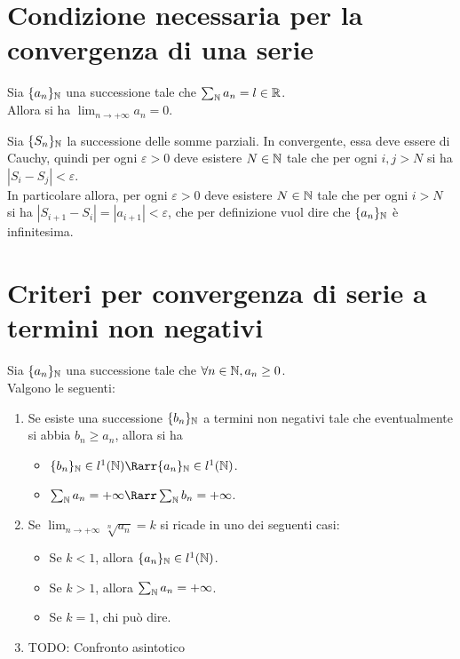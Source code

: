 \documentclass[openany]{book}
\begin{document}
\section{Condizione necessaria per la convergenza di una serie}

\begin{theorem}{}{}
    Sia $\{a_n\}_{\mathbb{N}}$ una successione tale che $\sum_{\mathbb{N}} a_n = l \in \mathbb{R}$.\\
    Allora si ha $\lim_{n\to+\infty} a_n = 0$.
\end{theorem}

    Sia $\{S_n\}_{\mathbb{N}}$ la successione delle somme parziali. In convergente, essa deve essere di Cauchy, quindi per ogni $\varepsilon>0$ deve esistere $N \in \mathbb{N}$ tale che per ogni $i, j > N$ si ha $|S_i - S_j|<\varepsilon$.\\
    In particolare allora, per ogni $\varepsilon>0$ deve esistere $N\in \mathbb{N}$ tale che per ogni $i>N$ si ha $|S_{i+1}-S_i| = |a_{i+1}| < \varepsilon$, che per definizione vuol dire che $\{a_n\}_{\mathbb{N}}$ è infinitesima.


\section{Criteri per convergenza di serie a termini non negativi}

\begin{theorem}{}{}
    Sia $\{a_n\}_{\mathbb{N}}$ una successione tale che $\forall n \in \mathbb{N}, a_n \ge 0$.\\
    Valgono le seguenti: \begin{enumerate}
        \item Se esiste una successione $\{b_n\}_{\mathbb{N}}$ a termini non negativi tale che eventualmente si abbia $b_n \ge a_n$, allora si ha \begin{itemize}
            \item $\{b_n\}_\N \in l^1(\N) \Rarr \{a_n\}_\N \in l^1(\N)$.
            \item $\sum_\N a_n = +\infty \Rarr \sum_\N b_n = +\infty$.
        \end{itemize}
        \item Se $\lim_{n\to+\infty} \sqrt[n]{a_n} = k$ si ricade in uno dei seguenti casi: \begin{itemize}
            \item Se $k<1$, allora $\{a_n\}_{\mathbb{N}} \in l^1(\mathbb{N})$.
            \item Se $k>1$, allora $\sum_{\mathbb{N}} a_n = +\infty$.
            \item Se $k=1$, chi può dire.
        \end{itemize}
        \item TODO: Confronto asintotico
    \end{enumerate}
\end{theorem}{}{}
\end{document}
